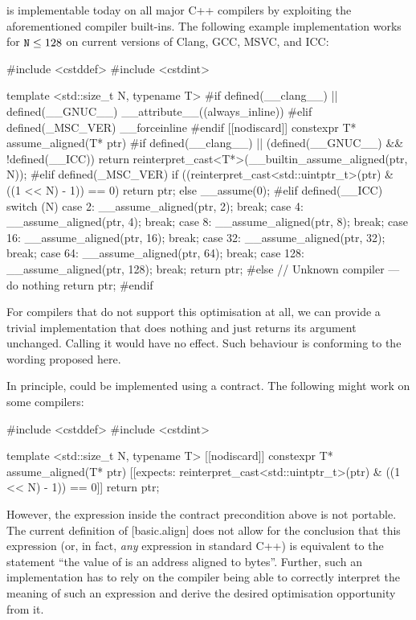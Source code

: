  is implementable today on all major C++ compilers by exploiting the aforementioned compiler built-ins. The following example implementation works for $\texttt{N} \leq 128$ on current versions of Clang, GCC, MSVC, and ICC:

\begin{codeblock}
#include <cstddef>
#include <cstdint>

template <std::size_t N, typename T>
#if defined(__clang__) || defined(__GNUC__)
__attribute__((always_inline))
#elif defined(_MSC_VER)
__forceinline
#endif
[[nodiscard]] constexpr T* assume_aligned(T* ptr) 
{
#if defined(__clang__) || (defined(__GNUC__) && !defined(__ICC))
    return reinterpret_cast<T*>(__builtin_assume_aligned(ptr, N));
#elif defined(_MSC_VER)
    if ((reinterpret_cast<std::uintptr_t>(ptr) & ((1 << N) - 1)) == 0)
        return ptr;
    else
        __assume(0);
#elif defined(__ICC)
    switch (N) {
        case 2:   __assume_aligned(ptr, 2);   break;
        case 4:   __assume_aligned(ptr, 4);   break;
        case 8:   __assume_aligned(ptr, 8);   break;
        case 16:  __assume_aligned(ptr, 16);  break;
        case 32:  __assume_aligned(ptr, 32);  break;
        case 64:  __assume_aligned(ptr, 64);  break;
        case 128: __assume_aligned(ptr, 128); break;
    }
    return ptr;
#else      
    // Unknown compiler --- do nothing
    return ptr; 
#endif
}
\end{codeblock}

For compilers that do not support this optimisation at all, we can provide a trivial implementation that does nothing and just returns its argument unchanged. Calling it would have no effect. Such behaviour is conforming to the wording proposed here.

In principle,  could be implemented using a contract. The following might work on some compilers:

\begin{minipage}{\textwidth}
\begin{codeblock}
#include <cstddef>
#include <cstdint>

template <std::size_t N, typename T>
[[nodiscard]] constexpr T* assume_aligned(T* ptr)
    [[expects: reinterpret_cast<std::uintptr_t>(ptr) & ((1 << N) - 1)) == 0]] 
{
    return ptr;
}
\end{codeblock}
\end{minipage}

However, the expression inside the contract precondition above is not portable. The current definition of [basic.align] does not allow for the conclusion that this expression (or, in fact, \emph{any} expression in standard C++) is equivalent to the statement ``the value of  is an address aligned to  bytes''. Further, such an implementation has to rely on the compiler being able to correctly interpret the meaning of such an expression and derive the desired optimisation opportunity from it.

